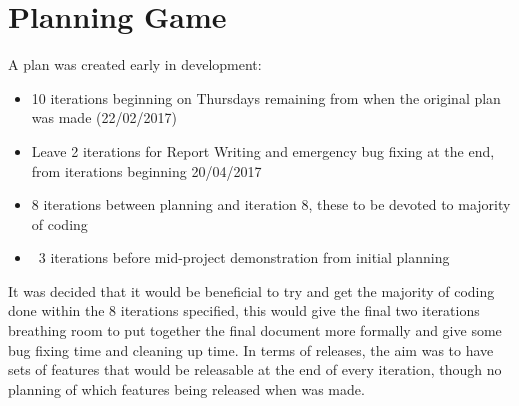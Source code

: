 \section{Planning Game}
A plan was created early in development:
\begin{itemize}
	\item 10 iterations beginning on Thursdays remaining from when the original plan was made (22/02/2017)
	\item Leave 2 iterations for Report Writing and emergency bug fixing at the end, from iterations beginning 20/04/2017
	\item 8 iterations between planning and iteration 8, these to be devoted to majority of coding
	\item ~3 iterations before mid-project demonstration from initial planning
\end{itemize}
It was decided that it would be beneficial to try and get the majority of coding done within the 8 iterations specified, this would give the final two iterations breathing room to put together the final document more formally and give some bug fixing time and cleaning up time. In terms of releases, the aim was to have sets of features that would be releasable at the end of every iteration, though no planning of which features being released when was made.
\newpage